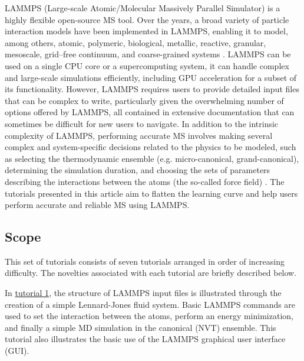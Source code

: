 \documentclass[9pt,tutorial]{livecoms}
\begin{document}
LAMMPS (Large-scale Atomic/Molecular Massively Parallel Simulator) \cite{lammps_home} is a highly flexible open-source MS tool. Over the years, a broad variety of particle interaction models have been implemented in LAMMPS, enabling it to model, among others, atomic, polymeric, biological, metallic, reactive, granular, mesoscale, grid--free continuum, and coarse-grained systems \cite{thompson2022lammps}. LAMMPS can be used on a single CPU core or a supercomputing system, it can handle complex and large-scale simulations efficiently, including GPU acceleration for a subset of its functionality.
However, LAMMPS requires users to provide detailed input files that can be complex to write, particularly given the overwhelming number of options offered by LAMMPS, all contained in extensive documentation that can sometimes be difficult for new users to navigate. In addition to the intrinsic complexity of LAMMPS, performing accurate MS involves making several complex and system-specific decisions related to the physics to be modeled, such as selecting the thermodynamic ensemble (e.g. micro-canonical, grand-canonical), determining the simulation duration, and choosing the sets of parameters describing the interactions between the atoms (the so-called force field) \cite{van2018validation}. The tutorials presented in this article aim to flatten the learning curve and help users perform accurate and reliable MS using LAMMPS.

\subsection{Scope}

This set of tutorials consists of seven tutorials arranged in order of increasing difficulty. The novelties associated with each tutorial are briefly described below.

In \hyperref[lennard-jones-label]{tutorial 1}, the structure of LAMMPS input files is illustrated through the creation of a simple Lennard-Jones fluid system. Basic LAMMPS commands are used to set the interaction between the atoms, perform an energy minimization, and finally a simple MD simulation in the canonical (NVT) ensemble. This tutorial also illustrates the basic use of the LAMMPS graphical user interface (GUI).
\end{document}
